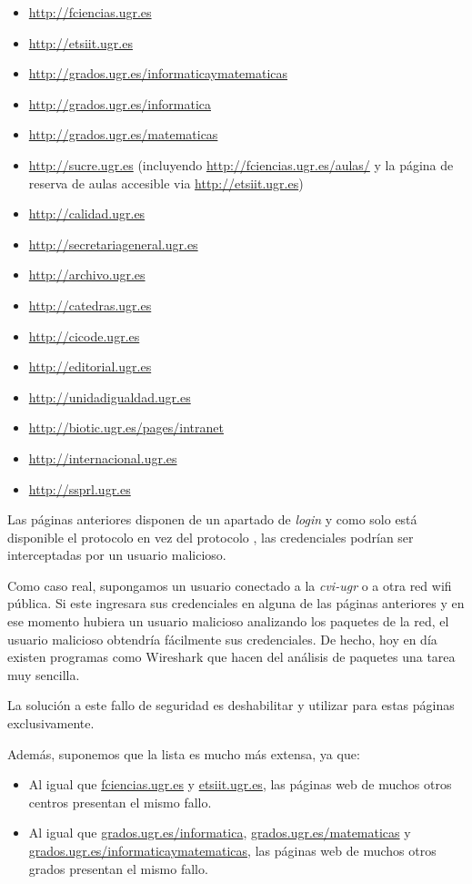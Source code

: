 \begin{itemize}
  \item \url{http://fciencias.ugr.es}
  \item \url{http://etsiit.ugr.es}
  \item \url{http://grados.ugr.es/informaticaymatematicas}
  \item \url{http://grados.ugr.es/informatica}
  \item \url{http://grados.ugr.es/matematicas}
  \item \url{http://sucre.ugr.es} (incluyendo \url{http://fciencias.ugr.es/aulas/} y la página de reserva de aulas accesible via \url{http://etsiit.ugr.es})
  \item \url{http://calidad.ugr.es}
  \item \url{http://secretariageneral.ugr.es}
  \item \url{http://archivo.ugr.es}
  \item \url{http://catedras.ugr.es}
  \item \url{http://cicode.ugr.es}
  \item \url{http://editorial.ugr.es}
  \item \url{http://unidadigualdad.ugr.es}
  \item \url{http://biotic.ugr.es/pages/intranet}
  \item \url{http://internacional.ugr.es}
  \item \url{http://ssprl.ugr.es}
\end{itemize}

Las páginas anteriores disponen de un apartado de \emph{login} y como solo está disponible el protocolo   en vez del protocolo  , las credenciales podrían ser interceptadas por un usuario malicioso.

Como caso real, supongamos un usuario conectado a la \emph{cvi-ugr} o a otra red wifi pública. Si este ingresara sus credenciales en alguna de las páginas anteriores y en ese momento hubiera un usuario malicioso analizando los paquetes de la red, el usuario malicioso obtendría fácilmente sus credenciales. De hecho, hoy en día existen programas como Wireshark que hacen del análisis de paquetes una tarea muy sencilla.

La solución a este fallo de seguridad es deshabilitar   y utilizar para estas páginas   exclusivamente.

Además, suponemos que la lista es mucho más extensa, ya que:
\begin{itemize}
  \item Al igual que \href{http://fciencias.ugr.es}{fciencias.ugr.es} y \href{http://etsiit.ugr.es}{etsiit.ugr.es}, las páginas web de muchos otros centros presentan el mismo fallo.
  \item Al igual que \href{http://grados.ugr.es/informatica}{grados.ugr.es/informatica}, \href{http://grados.ugr.es/matematicas}{grados.ugr.es/matematicas} y \href{http://grados.ugr.es/informaticaymatematicas}{grados.ugr.es/informaticaymatematicas}, las páginas web de muchos otros grados presentan el mismo fallo.
\end{itemize}

